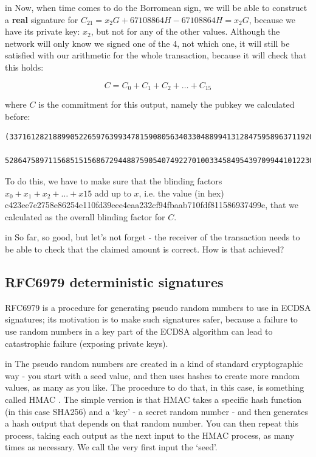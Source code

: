 \documentclass[10pt,a4paper]{article}
\begin{document}
 in \noindent Now, when time comes to do the Borromean sign, we will be able to construct a \textbf{real} signature for $C_{21} = x_{2}G + 67108864H - 67108864H = x_{2}G$, because we have its private key: $x_{2}$, but not for any of the other values. Although the network will only know we signed one of the 4, not which one, it will still be satisfied with our arithmetic for the whole transaction, because it will check that this holds:

\[C = C_{0} + C_{1} + C_{2} + \ldots + C_{15}\]

where $C$ is the commitment for this output, namely the pubkey we calculated before:

\begin{verbatim}
(33716128218899052265976399347815908056340330488994131284759589637119207433518L,
   52864758971156851515686729448875905407492270100334584954397099441012230985012L)
\end{verbatim}

To do this, we have to make sure that the blinding factors $x_{0} + x_{1} + x_{2} + \ldots + x{15}$ add up to $x$, i.e. the value (in hex) c423ee7e2758e86254e110fd39eee4eaa232cf94fbaab710fdf811586937499e, that we calculated as the overall blinding factor for $C$.

 in \noindent So far, so good, but let's not forget - the receiver of the transaction needs to be able to check that the claimed amount is correct. How is that achieved?

\subsection{RFC6979 deterministic signatures}

RFC6979 \cite{rfc6979} is a procedure for generating pseudo random numbers to use in ECDSA signatures; its motivation is to make such signatures safer, because a failure to use random numbers in a key part of the ECDSA algorithm can lead to catastrophic failure (exposing private keys).

 in \noindent The pseudo random numbers are created in a kind of standard cryptographic way - you start with a seed value, and then uses hashes to create more random values, as many as you like. The procedure to do that, in this case, is something called HMAC \cite{hmac}. The simple version is that HMAC takes a specific hash function (in this case SHA256) and a `key' - a secret random number - and then generates a hash output that depends on that random number. You can then repeat this process, taking each output as the next input to the HMAC process, as many times as necessary. We call the very first input the `seed'.
\end{document}
